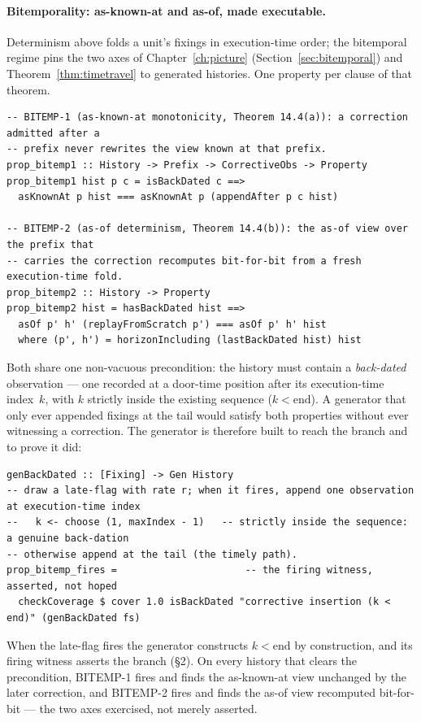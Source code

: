\documentclass[11pt,a4paper]{article}
\begin{document}
\paragraph{Bitemporality: as-known-at and as-of, made executable.}
Determinism above folds a unit's fixings in execution-time order; the bitemporal regime pins the
two axes of Chapter~\ref{ch:picture} (Section~\ref{sec:bitemporal}) and
Theorem~\ref{thm:timetravel} to generated histories. One property per clause of that theorem.

\begin{lstlisting}
-- BITEMP-1 (as-known-at monotonicity, Theorem 14.4(a)): a correction admitted after a
-- prefix never rewrites the view known at that prefix.
prop_bitemp1 :: History -> Prefix -> CorrectiveObs -> Property
prop_bitemp1 hist p c = isBackDated c ==>
  asKnownAt p hist === asKnownAt p (appendAfter p c hist)

-- BITEMP-2 (as-of determinism, Theorem 14.4(b)): the as-of view over the prefix that
-- carries the correction recomputes bit-for-bit from a fresh execution-time fold.
prop_bitemp2 :: History -> Property
prop_bitemp2 hist = hasBackDated hist ==>
  asOf p' h' (replayFromScratch p') === asOf p' h' hist
  where (p', h') = horizonIncluding (lastBackDated hist) hist
\end{lstlisting}

Both share one non-vacuous precondition: the history must contain a \emph{back-dated}
observation --- one recorded at a door-time position after its execution-time index~$k$,
with $k$ strictly inside the existing sequence ($k < \text{end}$). A generator that only ever
appended fixings at the tail would satisfy both properties without ever witnessing a
correction. The generator is
therefore built to reach the branch and to prove it did:

\begin{lstlisting}
genBackDated :: [Fixing] -> Gen History
-- draw a late-flag with rate r; when it fires, append one observation at execution-time index
--   k <- choose (1, maxIndex - 1)   -- strictly inside the sequence: a genuine back-dation
-- otherwise append at the tail (the timely path).
prop_bitemp_fires =                      -- the firing witness, asserted, not hoped
  checkCoverage $ cover 1.0 isBackDated "corrective insertion (k < end)" (genBackDated fs)
\end{lstlisting}

When the late-flag fires the generator constructs $k<\text{end}$ by construction, and its
firing witness asserts the branch (\S 2). On every history that clears the precondition,
BITEMP-1 fires and finds the as-known-at view unchanged by the later correction, and BITEMP-2
fires and finds the as-of view recomputed bit-for-bit --- the two axes exercised, not merely
asserted.
\end{document}
